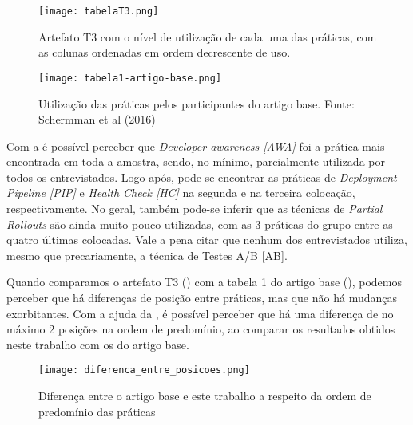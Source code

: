 \begin{figure}[ht]
\begin{center}
\texttt{[image: tabelaT3.png]}
\end{center}
\caption[Artefato T3]{
    Artefato T3 com o nível de utilização de cada uma das práticas, com as colunas ordenadas em ordem decrescente de uso.
}\label{tabela_t3}
\end{figure}

\begin{figure}[ht]
\begin{center}
\texttt{[image: tabela1-artigo-base.png]}
\end{center}
\caption[Tabela 1 do artigo base]{
    Utilização das práticas pelos participantes do artigo base.
    Fonte: Schermman et al (2016)
}\label{tabela_1_artigo_base}
\end{figure}

Com a  é possível perceber que \emph{Developer awareness [AWA]} foi a prática mais encontrada em toda a amostra, sendo, no mínimo, parcialmente utilizada por todos os entrevistados. Logo após, pode-se encontrar as práticas de \emph{Deployment Pipeline [PIP]} e \emph{Health Check [HC]} na segunda e na terceira colocação, respectivamente. No geral, também pode-se inferir que as técnicas de \emph{Partial Rollouts} são ainda muito pouco utilizadas, com as 3 práticas do grupo entre as quatro últimas colocadas. Vale a pena citar que nenhum dos entrevistados utiliza, mesmo que precariamente, a técnica de Testes A/B [AB].

Quando comparamos o artefato T3 () com a tabela 1 do artigo base (), podemos perceber que há diferenças de posição entre práticas, mas que não há mudanças exorbitantes. Com a ajuda da , é possível perceber que há uma diferença de no máximo 2 posições na ordem de predomínio, ao comparar os resultados obtidos neste trabalho com os do artigo base. 

\begin{figure}[ht]
\begin{center}
\texttt{[image: diferenca\_entre\_posicoes.png]}
\end{center}
\caption[Diferença entre a ordem de predomínio das práticas]{
    Diferença entre o artigo base e este trabalho a respeito da ordem de predomínio das práticas
}\label{diferenca_entre_posicoes_fig}
\end{figure}

